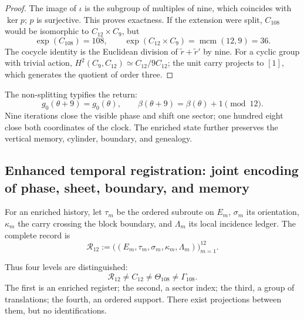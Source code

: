 {\begin{proof}
The image of \(\iota\) is the subgroup of multiples of nine, which coincides
with \(\ker p\); \(p\) is surjective. This proves exactness. If the
extension were split, \(C_{108}\) would be isomorphic to
\(C_{12}\times C_9\), but
\[
 \exp(C_{108})=108,
 \qquad
 \exp(C_{12}\times C_9)=\operatorname{mcm}(12,9)=36.
\]
The cocycle identity is the Euclidean division of \(\widetilde r+\widetilde r'\) by nine.
For a cyclic group with trivial action, \(H^2(C_9,C_{12})\simeq C_{12}/9C_{12}\); the unit carry
projects to \([1]\), which generates the quotient of order three.
\end{proof}

The non-splitting typifies the return:
\[
 g_0(\theta+9)=g_0(\theta),
 \qquad
 \beta(\theta+9)=\beta(\theta)+1\pmod{12}.
\]
Nine iterations close the visible phase and shift one sector; one hundred
eight close both coordinates of the clock. The enriched state further preserves
the vertical memory, cylinder, boundary, and genealogy.

\subsection{Enhanced temporal registration: joint encoding of phase, sheet, boundary, and memory}

\begin{definition}
\label{p12-83-c1-s9:def:u006d-registro-dodecafasico}
For an enriched history, let \(\tau_m\) be the ordered subroute on
\(E_m\), \(\sigma_m\) its orientation, \(\kappa_m\) the carry crossing the
block boundary, and \(\Lambda_m\) its local incidence ledger. The
complete record is
\begin{equation}
 \mathcal R_{12}:=
 \bigl(
 (E_m,\tau_m,\sigma_m,\kappa_m,\Lambda_m)
 \bigr)_{m=1}^{12}.
 \label{p12-83-c1-s9:eq:u006d-registro-r12}
\end{equation}
\end{definition}

Thus four levels are distinguished:
\begin{equation}
 \boxed{
 \mathcal R_{12}
 \neq C_{12}
 \neq\Theta_{108}
 \neq\Gamma_{108}.}
 \label{p12-83-c1-s9:eq:u006d-cuatro-objetos}
\end{equation}
The first is an enriched register; the second, a sector index; the
third, a group of translations; the fourth, an ordered support. There exist
projections between them, but no identifications.

}
